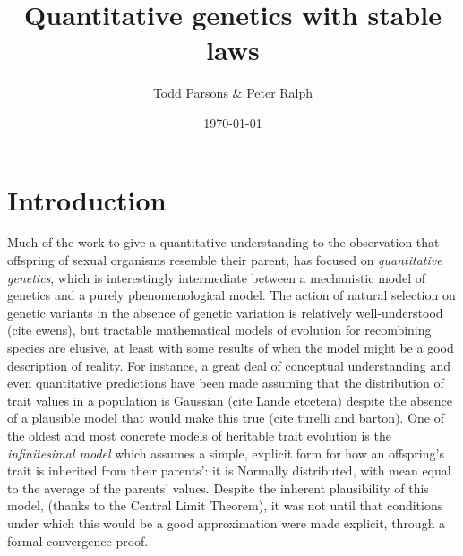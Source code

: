 \documentclass{article}
\theoremstyle{remark}
\theoremstyle{definition}
\begin{document}
% 
% 
% 
% 
% 

\title{\large{\bf
    Quantitative genetics with stable laws
}}

\author{ \begin{small}
    Todd Parsons \&
    Peter Ralph
\end{small}}

\date{\today}
\maketitle

\begin{abstract}
\end{abstract}

\section{Introduction}

Much of the work to give a quantitative understanding to the observation that
offspring of sexual organisms resemble their parent,
has focused on \emph{quantitative genetics},
which is interestingly intermediate between a mechanistic model of genetics
and a purely phenomenological model.
The action of natural selection on genetic variants in the absence of genetic variation
is relatively well-understood (cite ewens),
but tractable mathematical models of evolution for recombining species
are elusive,
at least with some results of when the model might be a good description of reality.
For instance, a great deal of conceptual understanding and even quantitative predictions
have been made assuming that the distribution of trait values in a population is Gaussian
(cite Lande etcetera)
despite the absence of a plausible model that would make this true (cite turelli and barton).
One of the oldest and most concrete models of heritable trait evolution is the \emph{infinitesimal model}
which assumes a simple, explicit form for how an offspring's trait is inherited from their parents':
it is Normally distributed, with mean equal to the average of the parents' values.
Despite the inherent plausibility of this model,
(thanks to the Central Limit Theorem),
it was not until \citet{barton2017infinitesimal} that conditions under which this would be a good approximation
were made explicit,
through a formal convergence proof.
\end{document}
